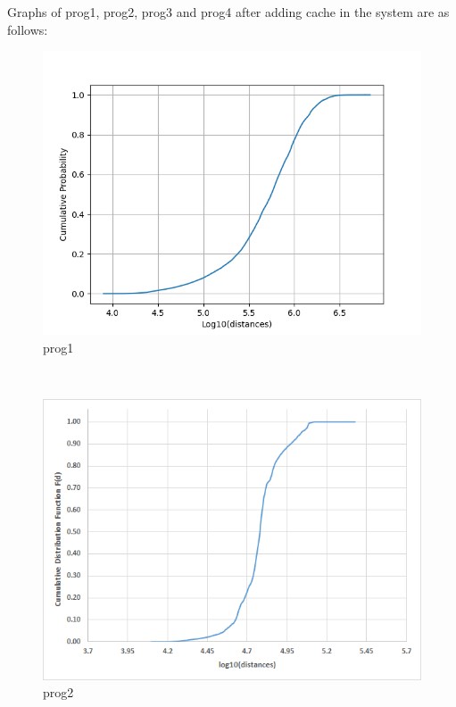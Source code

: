 \documentclass[12pt,oneside,reqno]{amsart}
\begin{document}
\bigskip
Graphs of prog1, prog2, prog3 and prog4 after adding cache in the system are as follows:
\begin{figure}[h]
    \centering
		\includegraphics[scale=0.7]{q3_prog1.png}
    	\caption{prog1}

\end{figure}\\

\newpage
	\begin{figure}[h]
    \centering
		\includegraphics[scale=1.1]{q3_prog2.png}
    	\caption{prog2}
    	\end{figure}
\end{document}
